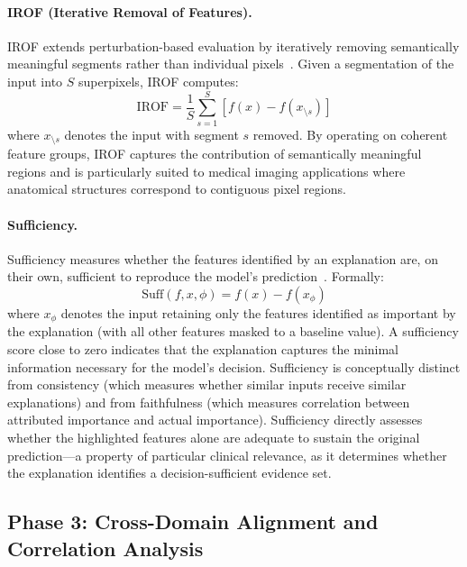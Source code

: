 \paragraph{IROF (Iterative Removal of Features).}
IROF extends perturbation-based evaluation by iteratively removing semantically meaningful segments rather than individual pixels~\cite{rieger2020irof}. Given a segmentation of the input into $S$ superpixels, IROF computes:
\begin{equation}
\text{IROF} = \frac{1}{S} \sum_{s=1}^{S} \left[ f(x) - f(x_{\setminus s}) \right]
\label{eq:irof}
\end{equation}
where $x_{\setminus s}$ denotes the input with segment $s$ removed. By operating on coherent feature groups, IROF captures the contribution of semantically meaningful regions and is particularly suited to medical imaging applications where anatomical structures correspond to contiguous pixel regions.

\paragraph{Sufficiency.}
Sufficiency measures whether the features identified by an explanation are, on their own, sufficient to reproduce the model's prediction~\cite{yeh2019fidelity}. Formally:
\begin{equation}
\text{Suff}(f, x, \phi) = f(x) - f(x_{\phi})
\label{eq:sufficiency}
\end{equation}
where $x_{\phi}$ denotes the input retaining only the features identified as important by the explanation (with all other features masked to a baseline value). A sufficiency score close to zero indicates that the explanation captures the minimal information necessary for the model's decision. Sufficiency is conceptually distinct from consistency (which measures whether similar inputs receive similar explanations) and from faithfulness (which measures correlation between attributed importance and actual importance). Sufficiency directly assesses whether the highlighted features alone are adequate to sustain the original prediction---a property of particular clinical relevance, as it determines whether the explanation identifies a decision-sufficient evidence set.

\subsection{Phase 3: Cross-Domain Alignment and Correlation Analysis}

